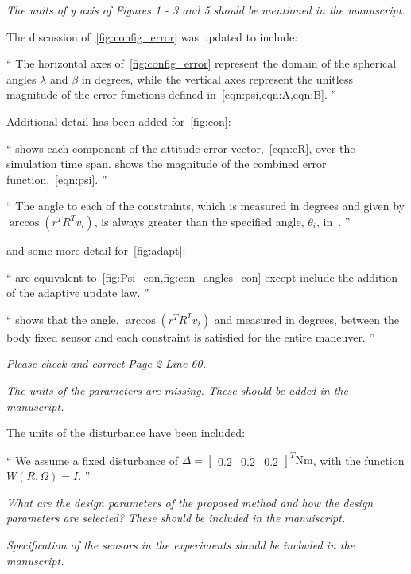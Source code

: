 \documentclass[11pt]{article}
\newenvironment{correction}{\begin{list}{}{\setlength{\leftmargin}{1cm}\setlength{\rightmargin}{1cm}}\vspace{\parsep}\item[]``}{''\end{list}}
\begin{document}
\begin{enumerate}
\item \textit{The units of y axis of Figures 1 - 3 and 5 should be mentioned in the manuscript.}

The discussion of~\cref{fig:config_error} was updated to include:
\begin{correction}
    The horizontal axes of~\cref{fig:config_error} represent the domain of the spherical angles \( \lambda \) and \( \beta \) in degrees, while the vertical axes represent the unitless magnitude of the error functions defined in~\cref{eqn:psi,eqn:A,eqn:B}.    
\end{correction}


Additional detail has been added for~\cref{fig:con}:
\begin{correction}
     shows each component of the attitude error vector,~\cref{eqn:eR}, over the simulation time span.
     shows the  magnitude of the combined error function,~\cref{eqn:psi}.
\end{correction}
\begin{correction}
    The angle to each of the constraints, which is measured in degrees and given by \( \arccos(r^T R^T v_i) \), is always greater than the specified angle, \( \theta_i \), in~.
\end{correction}
and some more detail for~\cref{fig:adapt}:
\begin{correction}
     are equivalent to~\cref{fig:Psi_con,fig:con_angles_con} except include the addition of the adaptive update law.
\end{correction}
\begin{correction}
     shows that the angle, \( \arccos(r^T R^T v_i) \) and measured in degrees, between the body fixed sensor and each constraint is satisfied for the entire maneuver.
\end{correction}
\item \textit{Please check and correct Page 2 Line 60.}
\item \textit{The units of the parameters are missing. These should be added in the manuscript.}

The units of the disturbance have been included:
\begin{correction}
    We assume a fixed disturbance of \(\Delta = \begin{bmatrix} 0.2 & 0.2 & 0.2 \end{bmatrix}^T \si{\newton\meter}\), with the function \( W(R,\Omega) = I \).
\end{correction}
\item \textit{What are the design parameters of the proposed method and how the design parameters are selected? These should be included in the manuiscript.}
\item \textit{Specification of the sensors in the experiments should be included in the manuscript.}
\end{enumerate}
\end{document}
